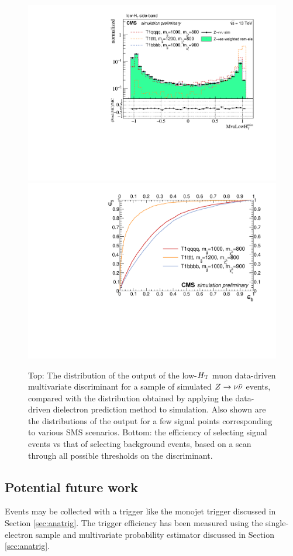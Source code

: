\begin{figure}[tb!]
\centering
\includegraphics[width=0.7\linewidth]{figures/SusySearches/MvaLowHt.pdf}
\includegraphics[width=0.7\linewidth]{figures/SusySearches/RocCurvesLowHt_ZinvVsSUSY.pdf}
\caption{Top: The distribution of the output of the low-$H_{\rm T}$ muon data-driven multivariate discriminant for a sample of simulated $Z\rightarrow \nu\bar{\nu}$ events, compared with the distribution obtained by applying the data-driven dielectron prediction method to simulation. Also shown are the distributions of the output for a few signal points corresponding to various SMS scenarios. Bottom: the efficiency of selecting signal events vs that of selecting background events, based on a scan through all possible thresholds on the discriminant.}
\label{fig:SusyBdt2}
\end{figure}

\subsection{Potential future work}

Events may be collected with a trigger like the monojet trigger discussed in Section \ref{sec:anatrig}. The trigger efficiency has been measured using the single-electron sample and multivariate probability estimator discussed in Section \ref{sec:anatrig}. 

